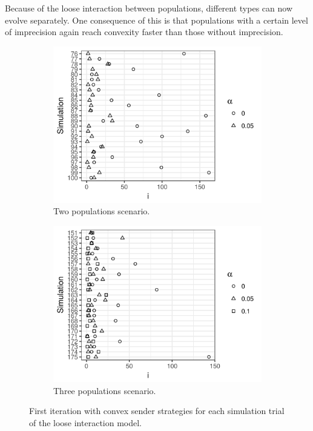 \documentclass[a4paper]{article}
\begin{document}
Because of the loose interaction between populations, different types can now evolve separately.
One consequence of this is that populations with a certain level of imprecision again reach convexity faster than those without imprecision.
\begin{figure}
  \centering
  \begin{subfigure}[]{0.45\textwidth}
    \includegraphics[width=\textwidth]{simulation/results/round-3/plots/convex-cases-0-005-weakest.png}
    \caption{Two populations scenario.}
    \label{fig:convex-cases-two-loose-interaction}
  \end{subfigure}
  \hfill
  \begin{subfigure}[]{0.45\textwidth}
    \includegraphics[width=\textwidth]{simulation/results/round-3/plots/convex-cases-0-005-01-weakest.png}
    \caption{Three populations scenario.}
    \label{fig:convex-cases-three-loose-interaction}
  \end{subfigure}
  \caption{First iteration with convex sender strategies for each simulation trial of the loose interaction model.}
  \label{fig:convex-cases-loose-interaction}
\end{figure}
\end{document}
